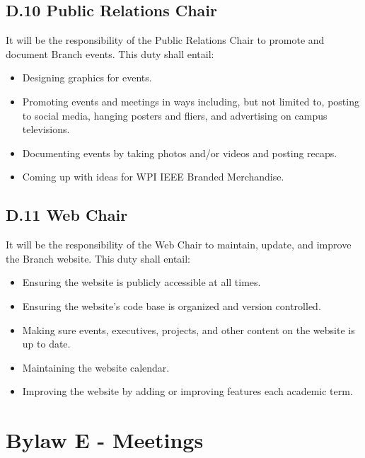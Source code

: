 \documentclass[11pt,a4paper]{article}
\begin{document}
\subsection*{D.10 Public Relations Chair}
It will be the responsibility of the Public Relations Chair to promote and document Branch events. This duty shall entail:
\begin{itemize}[noitemsep]
    \item Designing graphics for events.
    \item Promoting events and meetings in ways including, but not limited to, posting to social media, hanging posters and fliers, and advertising on campus televisions.
    \item Documenting events by taking photos and/or videos and posting recaps.
    \item Coming up with ideas for WPI IEEE Branded Merchandise.
\end{itemize}

\subsection*{D.11 Web Chair}
It will be the responsibility of the Web Chair to maintain, update, and improve the Branch website. This duty shall entail:
\begin{itemize}[noitemsep]
    \item Ensuring the website is publicly accessible at all times.
    \item Ensuring the website's code base is organized and version controlled.
    \item Making sure events, executives, projects, and other content on the website is up to date.
    \item Maintaining the website calendar.
    \item Improving the website by adding or improving features each academic term.
\end{itemize}


\section*{Bylaw E - Meetings}
\end{document}
